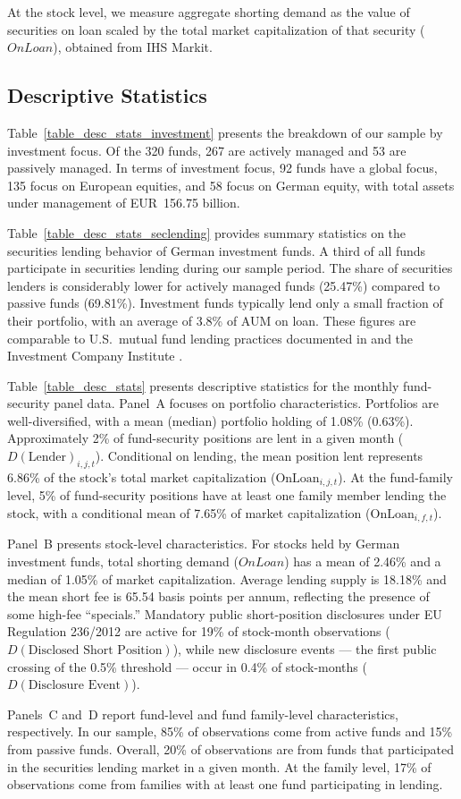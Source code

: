 At the stock level, we measure aggregate shorting demand as the value of securities on loan scaled by the total market capitalization of that security ($OnLoan$), obtained from IHS Markit.

\subsection{Descriptive Statistics}

Table~\ref{table_desc_stats_investment} presents the breakdown of our sample by investment focus. Of the 320 funds, 267 are actively managed and 53 are passively managed. In terms of investment focus, 92 funds have a global focus, 135 focus on European equities, and 58 focus on German equity, with total assets under management of EUR~156.75 billion.

Table~\ref{table_desc_stats_seclending} provides summary statistics on the securities lending behavior of German investment funds. A third of all funds participate in securities lending during our sample period. The share of securities lenders is considerably lower for actively managed funds (25.47\%) compared to passive funds (69.81\%). Investment funds typically lend only a small fraction of their portfolio, with an average of 3.8\% of AUM on loan. These figures are comparable to U.S.\ mutual fund lending practices documented in \citet{prado_saffi_sturgess:14} and the Investment Company Institute \citep{ICI2014Viewpoints}.

Table~\ref{table_desc_stats} presents descriptive statistics for the monthly fund-security panel data. Panel~A focuses on portfolio characteristics. Portfolios are well-diversified, with a mean (median) portfolio holding of 1.08\% (0.63\%). Approximately 2\% of fund-security positions are lent in a given month ($D(\text{Lender})_{i,j,t}$). Conditional on lending, the mean position lent represents 6.86\% of the stock's total market capitalization ($\text{OnLoan}_{i,j,t}$). At the fund-family level, 5\% of fund-security positions have at least one family member lending the stock, with a conditional mean of 7.65\% of market capitalization ($\text{OnLoan}_{i,f,t}$).

Panel~B presents stock-level characteristics. For stocks held by German investment funds, total shorting demand ($OnLoan$) has a mean of 2.46\% and a median of 1.05\% of market capitalization. Average lending supply is 18.18\% and the mean short fee is 65.54 basis points per annum, reflecting the presence of some high-fee ``specials.'' Mandatory public short-position disclosures under EU Regulation 236/2012 are active for 19\% of stock-month observations ($D(\text{Disclosed Short Position})$), while new disclosure events --- the first public crossing of the 0.5\% threshold --- occur in 0.4\% of stock-months ($D(\text{Disclosure Event})$).

Panels~C and~D report fund-level and fund family-level characteristics, respectively. In our sample, 85\% of observations come from active funds and 15\% from passive funds. Overall, 20\% of observations are from funds that participated in the securities lending market in a given month. At the family level, 17\% of observations come from families with at least one fund participating in lending.

